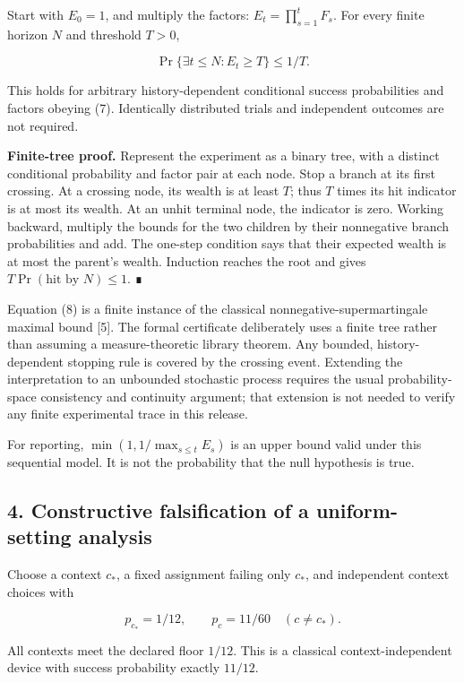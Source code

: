 \documentclass[10pt,a4paper]{article}
\begin{document}
Start with \(E_0=1\), and multiply the factors:
\(E_t=\prod_{s=1}^{t}F_s\). For every finite horizon \(N\) and threshold
\(T>0\),

\[
\Pr\{\exists t\le N:E_t\ge T\}\le 1/T. \tag{8}
\]

This holds for arbitrary history-dependent conditional success
probabilities and factors obeying (7). Identically distributed trials
and independent outcomes are not required.

\textbf{Finite-tree proof.} Represent the experiment as a binary tree,
with a distinct conditional probability and factor pair at each node.
Stop a branch at its first crossing. At a crossing node, its wealth is
at least \(T\); thus \(T\) times its hit indicator is at most its
wealth. At an unhit terminal node, the indicator is zero. Working
backward, multiply the bounds for the two children by their nonnegative
branch probabilities and add. The one-step condition says that their
expected wealth is at most the parent's wealth. Induction reaches the
root and gives \(T\Pr(\text{hit by }N)\le1\). ∎

Equation (8) is a finite instance of the classical
nonnegative-supermartingale maximal bound {[}5{]}. The formal
certificate deliberately uses a finite tree rather than assuming a
measure-theoretic library theorem. Any bounded, history-dependent
stopping rule is covered by the crossing event. Extending the
interpretation to an unbounded stochastic process requires the usual
probability-space consistency and continuity argument; that extension is
not needed to verify any finite experimental trace in this release.

For reporting, \(\min(1,1/\max_{s\le t}E_s)\) is an upper bound valid
under this sequential model. It is not the probability that the null
hypothesis is true.

\subsection{4. Constructive falsification of a uniform-setting
analysis}\label{constructive-falsification-of-a-uniform-setting-analysis}

Choose a context \(c_*\), a fixed assignment failing only \(c_*\), and
independent context choices with

\[
p_{c_*}=1/12,
\qquad p_c=11/60\quad(c\ne c_*). \tag{9}
\]

All contexts meet the declared floor \(1/12\). This is a classical
context-independent device with success probability exactly \(11/12\).
\end{document}
